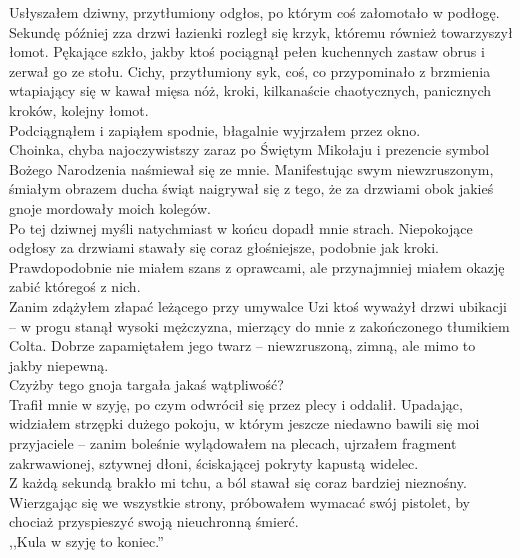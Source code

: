\documentclass[../MAIN.tex]{subfiles}
\begin{document}
Usłyszałem dziwny, przytłumiony odgłos, po którym coś załomotało w podłogę. Sekundę później zza drzwi łazienki rozległ się krzyk, któremu również towarzyszył łomot. Pękające szkło, jakby ktoś pociągnął pełen kuchennych zastaw obrus i zerwał go ze stołu. Cichy, przytłumiony syk, coś, co przypominało z brzmienia wtapiający się w kawał mięsa nóż, kroki, kilkanaście chaotycznych, panicznych kroków, kolejny łomot.\\
Podciągnąłem i zapiąłem spodnie, błagalnie wyjrzałem przez okno.\\
Choinka, chyba najoczywistszy zaraz po Świętym Mikołaju i prezencie symbol Bożego Narodzenia naśmiewał się ze mnie. Manifestując swym niewzruszonym, śmiałym obrazem ducha świąt naigrywał się z tego, że za drzwiami obok jakieś gnoje mordowały moich kolegów.\\
Po tej dziwnej myśli natychmiast w końcu dopadł mnie strach. Niepokojące odgłosy za drzwiami stawały się coraz głośniejsze, podobnie jak kroki. Prawdopodobnie nie miałem szans z oprawcami, ale przynajmniej miałem okazję zabić któregoś z nich.\\
Zanim zdążyłem złapać leżącego przy umywalce Uzi ktoś wyważył drzwi ubikacji -- w progu stanął wysoki mężczyzna, mierzący do mnie z zakończonego tłumikiem Colta. Dobrze zapamiętałem jego twarz -- niewzruszoną, zimną, ale mimo to jakby niepewną.\\
Czyżby tego gnoja targała jakaś wątpliwość?\\
Trafił mnie w szyję, po czym odwrócił się przez plecy i oddalił. Upadając, widziałem strzępki dużego pokoju, w którym jeszcze niedawno bawili się moi przyjaciele -- zanim boleśnie wylądowałem na plecach, ujrzałem fragment zakrwawionej, sztywnej dłoni, ściskającej pokryty kapustą widelec.\\
Z każdą sekundą brakło mi tchu, a ból stawał się coraz bardziej nieznośny. Wierzgając się we wszystkie strony, próbowałem wymacać swój pistolet, by chociaż przyspieszyć swoją nieuchronną śmierć.\\
,,Kula w szyję to koniec.''
\end{document}
